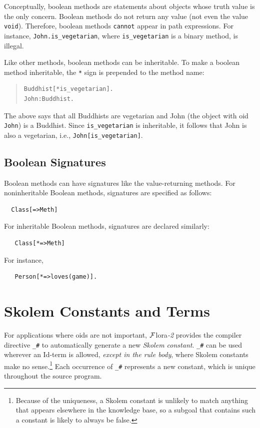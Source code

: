 \documentclass[11pt]{article}
\newcommand{\FLORA}{{\mbox{\sc ${\cal F}${lora}\rm\emph{-2}}}\xspace}
\begin{document}
Conceptually, boolean methods are statements about objects whose truth
value is the only concern. Boolean methods do not return any value (not
even the value {\tt void}). Therefore, boolean methods {\tt cannot} appear
in path expressions. For instance, \mbox{\tt John.is\_vegetarian}, where
{\tt is\_vegetarian} is a binary method, is illegal.

Like other methods, boolean methods can be inheritable. To make a
boolean method inheritable, the \verb|*| sign is prepended to
the method name:
\begin{quote}
\begin{verbatim}
Buddhist[*is_vegetarian].
John:Buddhist.
\end{verbatim}
\end{quote}
The above says that all Buddhists are vegetarian and John (the object with
oid {\tt John}) is a Buddhist. Since \verb|is_vegetarian| is inheritable,
it follows that John is also a vegetarian, i.e.,
\verb|John[is_vegetarian]|.

\subsection{Boolean Signatures}

Boolean methods can have signatures like the value-returning methods.
For noninheritable Boolean methods, signatures are specified as follows:
\begin{verbatim}
  Class[=>Meth]
\end{verbatim}
For inheritable Boolean methods, signatures are declared similarly:
\begin{verbatim}
   Class[*=>Meth]
\end{verbatim}
For instance,
\begin{verbatim}
   Person[*=>loves(game)].
\end{verbatim}


\section{Skolem Constants and Terms}\label{sec-anon-gen-oids}


%
For applications where oids are not important, \FLORA provides the
compiler directive \verb|_#| to automatically generate a new
\emph{Skolem constant}. \verb|_#| can be used wherever an Id-term is allowed, \emph{except in the
rule body}, where Skolem constants make no sense.\footnote{
  Because of the uniqueness, a Skolem constant is unlikely to match
  anything that appears elsewhere in the knowledge base, so a subgoal that
  contains such a constant is likely to always be false.
}
Each occurrence of \verb|_#| represents
a new constant, which is unique throughout
the source program.
\end{document}
